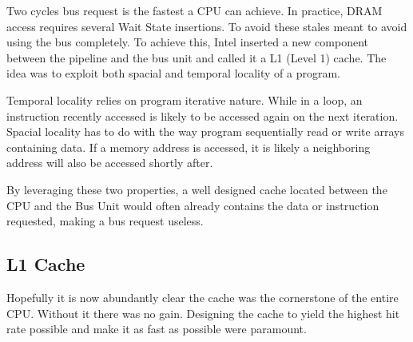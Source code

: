 \par
Two cycles bus request is the fastest a CPU can achieve. In practice, DRAM access requires several Wait State insertions.
To avoid these stales meant to avoid using the bus completely. To achieve this, Intel inserted a new component between the pipeline and the bus unit and called it a L1 (Level 1) cache. The idea was to exploit both spacial and temporal locality of a program.\\
\par
Temporal locality relies on program iterative nature. While in a loop, an instruction recently accessed is likely to be accessed again on the next iteration. Spacial locality has to do with the way program sequentially read or write arrays containing data. If a memory address is accessed, it is likely a neighboring address will also be accessed shortly after.\\
\par
By leveraging these two properties, a well designed cache located between the CPU and the Bus Unit would often already contains the data or instruction requested, making a bus request useless.\\
\par
{}




\subsection{L1 Cache}
Hopefully it is now abundantly clear the cache was the cornerstone of the entire CPU. Without it there was no gain. Designing the cache to yield the highest hit rate possible and make it as fast as possible were paramount. 

